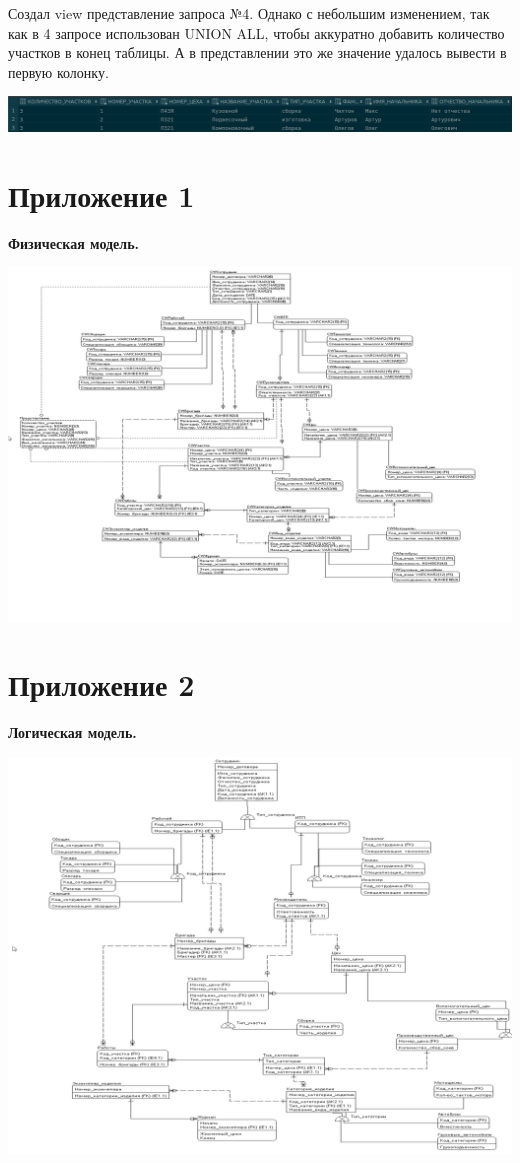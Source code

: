 Создал view представление запроса №4.
Однако с небольшим изменением, так как в 4 запросе использован UNION ALL, чтобы аккуратно добавить количество участков в конец таблицы.
А в представлении это же значение удалось вывести в первую колонку.

\includegraphics[width=16cm]{./screenshots/view/result.png}

\newpage

\section{Приложение 1}

    {\bf Физическая модель.}

    \includegraphics[width=16cm]{./screenshots/model/physical.png}

\newpage

\section{Приложение 2}

    {\bf Логическая модель.}

    \includegraphics[width=16cm]{./screenshots/model/logical.png}

